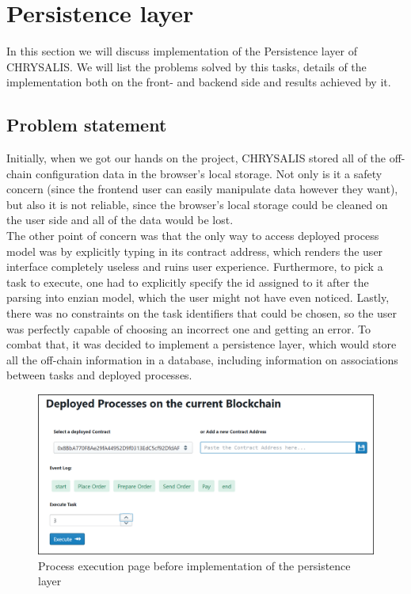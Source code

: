 %
\section{Persistence layer}
\label{sec:impr:persistence}

In this section we will discuss implementation of the Persistence layer of CHRYSALIS. We will list the problems solved by this tasks, details of the implementation both on the front- and backend side and results achieved by it. 

\subsection{Problem statement}
\label{sec:impr:persistence:problem}

Initially, when we got our hands on the project, CHRYSALIS stored all of the off-chain configuration data in the browser's local storage. Not only is it a safety concern (since the frontend user can easily manipulate data however they want), but also it is not reliable, since the browser's local storage could be cleaned on the user side and all of the data would be lost.\\

The other point of concern was that the only way to access deployed process model was by explicitly typing in its contract address, which renders the user interface completely useless and ruins user experience. Furthermore, to pick a task to execute, one had to explicitly specify the id assigned to it after the parsing into enzian model, which the user might not have even noticed. Lastly, there was no constraints on the task identifiers that could be chosen, so the user was perfectly capable of choosing an incorrect one and getting an error. To combat that, it was decided to implement a persistence layer, which would store all the off-chain information in a database, including information on associations between tasks and deployed processes. 

\begin{figure}[htb]
	\includegraphics[width=\textwidth]{gfx/persistence_before}
	\caption{Process execution page before implementation of the persistence layer}
	\label{fig:impr:persistence:before}
\end{figure}

